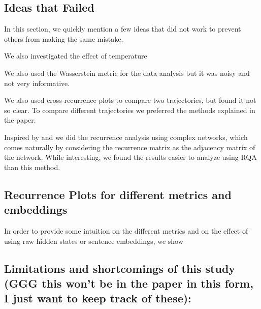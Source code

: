 \documentclass[a4paper,12pt]{article}
\begin{document}
\subsection{Ideas that Failed}
\label{subsec:appendix_failed_ideas} %
In this section, we quickly mention a few ideas that did not work to prevent others from making the same mistake.

We also investigated the effect of temperature

We also used the Wasserstein metric for the data analysis but it was noisy and not very informative.

We also used cross-recurrence plots to compare two trajectories, but found it not so clear. To compare different trajectories we preferred the methods explained in the paper.

Inspired by \cite{DONNER_2011} and \cite{Donner_2010} \cite{ZOU20191} we did the recurrence analysis using complex networks, which comes naturally by considering the recurrence matrix as the adjacency matrix of the network. While interesting, we found the results easier to analyze using RQA than this method. %

\subsection{Recurrence Plots for different metrics and embeddings} %

In order to provide some intuition on the different metrics and on the effect of using raw hidden states or sentence embeddings, we show 


\subsection{Limitations and shortcomings of this study (GGG this won't be in the paper in this form, I just want to keep track of these):}
\label{subsec:appendix_limitations}
\end{document}
